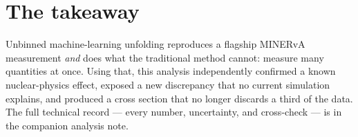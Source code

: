 \section{The takeaway}

Unbinned machine-learning unfolding reproduces a flagship MINERvA measurement
\emph{and} does what the traditional method cannot: measure many quantities at
once. Using that, this analysis independently confirmed a known nuclear-physics
effect, exposed a new discrepancy that no current simulation explains, and
produced a cross section that no longer discards a third of the data. The full
technical record --- every number, uncertainty, and cross-check --- is in the
companion analysis note.
